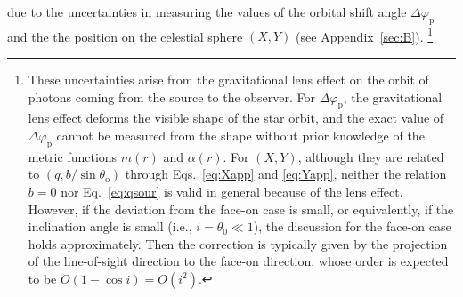 \documentclass[aps,11pt,nofootinbib,preprintnumbers,groupedaddress,superscriptaddress]{revtex4-2}
\begin{document}
due to the uncertainties in measuring the values of the orbital shift angle $\Delta\varphi_{\mathrm{p}}$ and the 
the position on the celestial sphere
$(X,Y)$ (see Appendix~\ref{sec:B}).%
\footnote{These uncertainties arise from the gravitational lens effect on the orbit of photons coming from the source to the observer. 
For $\Delta \varphi_{\mathrm{p}}$, the gravitational lens effect deforms the visible shape of 
the star orbit,
and the exact value of $\Delta \varphi_{\mathrm{p}}$ cannot be measured from the shape without prior knowledge of the metric functions $m(r)$ and $\alpha(r)$. For $(X,Y)$, although they are related to $(q, b/\sin\theta_{\mathrm{o}})$ through Eqs.~\eqref{eq:Xapp} and \eqref{eq:Yapp}, neither the 
relation
$b=0$ nor Eq.~\eqref{eq:qsour} is valid in general because of the lens effect. 
However, if the deviation from the face-on case is small, or equivalently, if the inclination angle is small 
(i.e., $i=\theta_0\ll 1$), 
the discussion for the face-on case holds approximately. 
Then the correction is typically given by the projection of the line-of-sight direction to the face-on direction, whose order is expected to be $O(1-\cos i)=O(i^2)$.} 
\end{document}
